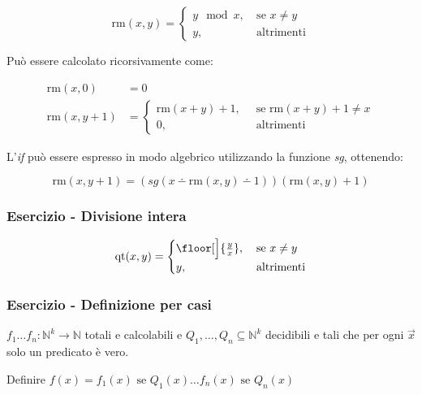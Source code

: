 $$\text{rm}(x,y) =\begin{cases}
y \mod x,\:& \text{se } x \neq y\\
y, \:& \text{altrimenti}
\end{cases}$$


Può essere calcolato ricorsivamente come:

\begin{align*}
\text{rm}(x,0) &= 0 \\
\text{rm}(x, y+1) &= \begin{cases}\text{rm}(x+y) +1, \:& \text{ se rm}(x+y) +1 \neq x\\
0, \:& \text{ altrimenti} \end{cases}
\end{align*}

L'\emph{if} può essere espresso in modo algebrico utilizzando la
funzione \emph{sg}, ottenendo:

$$\text{rm}(x, y+1) = (sg(x \dotminus \text{rm}(x,y) \dotminus 1))(\text{rm}(x,y)+1)$$

\subsubsection{Esercizio - Divisione intera}\label{esercizio---divisione-intera}

$$\text{qt}(x,y) =\begin{cases}
\floor[\Big]{\frac{y}{x}},\:& \text{se } x \neq y\\
y, \:& \text{altrimenti}
\end{cases}$$


\subsubsection{Esercizio - Definizione per casi}\label{esercizio---definzione-per-casi}

$f_1 \ldots f_n : \mathbb{N}^k \rightarrow \mathbb{N}$ totali e calcolabili e
$Q_1, \ldots, Q_n \subseteq \mathbb{N}^k$ decidibili e tali che per ogni $\vec{x}$ solo un predicato è vero.

Definire $f(x) = f_1(x) \text{ se } Q_1(x) \ldots f_n(x) \text{ se } Q_n(x)$

